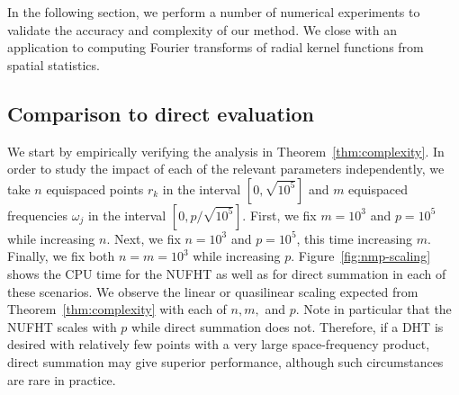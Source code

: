 In the following section, we perform a number of numerical experiments to
validate the accuracy and complexity of our method. We close with an application
to computing Fourier transforms of radial kernel functions from spatial
statistics.

\subsection{Comparison to direct evaluation}

We start by empirically verifying the analysis in Theorem~\ref{thm:complexity}.
In order to study the impact of each of the relevant parameters independently,
we take $n$ equispaced points $r_k$ in the interval $[0,\sqrt{10^5}]$ and $m$
equispaced frequencies $\omega_j$ in the interval $[0,p/\sqrt{10^5}]$. First, we
fix $m=10^3$ and $p=10^5$ while increasing $n$. Next, we fix $n=10^3$ and
$p=10^5$, this time increasing $m$. Finally, we fix both $n = m = 10^3$ while
increasing $p$. Figure~\ref{fig:nmp-scaling} shows the CPU time for the NUFHT as
well as for direct summation in each of these scenarios. We observe the linear
or quasilinear scaling expected from Theorem~\ref{thm:complexity} with each of
$n, m,$ and $p$. Note in particular that the NUFHT scales with $p$ while direct
summation does not. Therefore, if a DHT is desired with relatively few points
with a very large space-frequency product, direct summation may give superior
performance, although such circumstances are rare in practice.

